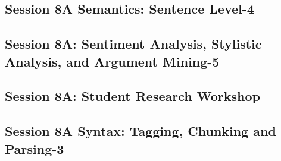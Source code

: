 \subsection{\large Session 8A Semantics: Sentence Level-4}
\label{parallel-session-8A-trackG}
\TrackGLoc\hfill\sessionchair{}{}
\clearpage
\subsection{\large Session 8A: Sentiment Analysis, Stylistic Analysis, and Argument Mining-5}
\label{parallel-session-8A-trackH}
\TrackHLoc\hfill\sessionchair{}{}
\clearpage
\subsection{\large Session 8A: Student Research Workshop}
\label{parallel-session-8A-trackI}
\TrackILoc\hfill\sessionchair{}{}
\clearpage
\subsection{\large Session 8A Syntax: Tagging, Chunking and Parsing-3}
\label{parallel-session-8A-trackJ}
\TrackJLoc\hfill\sessionchair{}{}
\clearpage


